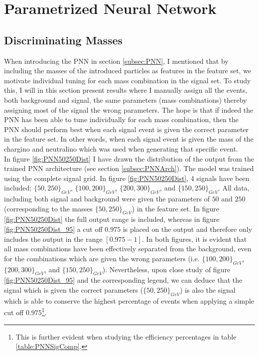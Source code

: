 \newpage
\section{Parametrized Neural Network}
\subsection{Discriminating Masses}
When introducing the \ac{PNN} in section \ref{subsec:PNN}, I mentioned that by including the masses of the introduced particles as features 
in the feature set, we motivate individual tuning for each mass combination in the signal set. To study this, I will in this section 
present results where I manually assign all the events, both background and signal, the same parameters (mass combinations) thereby assigning 
most of the signal the wrong parameters. The hope is that if indeed the \ac{PNN} has been able to tune individually for each mass combination, 
then the \ac{PNN} should perform best when each signal event is given the correct parameter in the feature set. In other words, when each signal 
event is given the mass of the chargino and neutralino which was used when generating that specific event.
\\
In figure \ref{fig:PNN50250Dist} I have drawn the distribution of the output from the trained \ac{PNN} architecture 
(see section \ref{subsec:PNNArch}). The model was trained using the complete signal grid. In figure \ref{fig:PNN50250Dist},
4 signals have been included; $\{50,250\}_{GeV}$, $\{100,200\}_{GeV}$, $\{200,300\}_{GeV}$, and $\{150,250\}_{GeV}$. All data, including 
both signal and background were given the parameters of $50$ and $250$ (corresponding to the masses $\{50,250\}_{GeV}$) in the feature set. 
In figure \ref{fig:PNN50250Dist} the full output range is included, whereas in figure \ref{fig:PNN50250Dist_95} a cut off $0.975$ is placed on the 
output and therefore only includes the output in the range $[0.975-1]$. In both figures, it is evident that all mass combinations have been 
effectively separated from the background, even for the combinations which are given the wrong parameters (i.e. $\{100,200\}_{GeV}$, $\{200,300\}_{GeV}$, 
and $\{150,250\}_{GeV}$). Nevertheless, upon close study of figure \ref{fig:PNN50250Dist_95} and the corresponding legend, we can deduce that the signal 
which is given the correct parameters ($\{50,250\}_{GeV}$) is also the signal which is able to conserve the highest percentage of events when applying a 
simple cut off $0.975$\footnote{This is further evident when studying the efficiency percentages in table \ref{table:PNNSigComp}.}.\\
